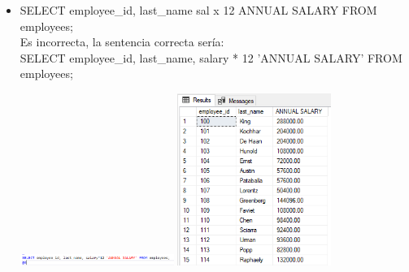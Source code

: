 \begin{itemize}
	\item SELECT employee\_id, last\_name sal x 12 ANNUAL SALARY FROM employees;
	\\Es incorrecta, la sentencia correcta sería:
	\\SELECT employee\_id, last\_name, salary * 12 'ANNUAL SALARY' FROM employees;
	\begin{center}
	\includegraphics[width=5cm]{./Imagenes/actividad_01_03a} 
	\includegraphics[width=5cm]{./Imagenes/actividad_01_03} 
	\end{center}

\end{itemize} 